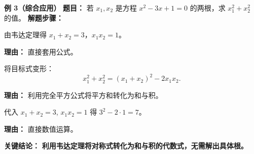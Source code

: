 \begin{examplebox}
	\medskip
	\textbf{\textcolor{CExample}{例 3（综合应用）}}
	\textbf{\textcolor{CExample}{题目：}}
	若 $x_1,x_2$ 是方程 $x^2-3x+1=0$ 的两根，求 $x_1^2+x_2^2$ 的值。
	\textbf{\textcolor{CExample}{解题步骤：}}
	\begin{description}[style=nextline, leftmargin=2.8em, labelsep=0.5em, itemsep=0.45em]
		\item[\textbf{第一步（写和积）：}]
			由韦达定理得 $x_1+x_2=3$，$x_1x_2=1$。
			\par\textbf{理由：} 直接套用公式。
		\item[\textbf{第二步（恒等变形）：}]
			将目标式变形：
			\[
				x_1^2+x_2^2 = (x_1+x_2)^2-2x_1x_2.
			\]
			\par\textbf{理由：} 利用完全平方公式将平方和转化为和与积。
		\item[\textbf{第三步（代入计算）：}]
			代入 $x_1+x_2=3$, $x_1x_2=1$ 得 $3^2-2\cdot1=7$。
			\par\textbf{理由：} 直接数值运算。
	\end{description}
	\textbf{\textcolor{CExample}{关键结论：}}
	\textbf{利用韦达定理将对称式转化为和与积的代数式，无需解出具体根。}
\end{examplebox}

